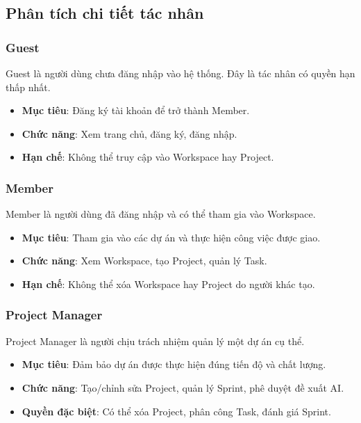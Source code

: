 \documentclass[12pt,a4paper]{report}
\begin{document}
\subsection{Phân tích chi tiết tác nhân}

\subsubsection{Guest}

Guest là người dùng chưa đăng nhập vào hệ thống. Đây là tác nhân có quyền hạn thấp nhất.

\begin{itemize}
\item \textbf{Mục tiêu}: Đăng ký tài khoản để trở thành Member.
\item \textbf{Chức năng}: Xem trang chủ, đăng ký, đăng nhập.
\item \textbf{Hạn chế}: Không thể truy cập vào Workspace hay Project.
\end{itemize}

\subsubsection{Member}

Member là người dùng đã đăng nhập và có thể tham gia vào Workspace.

\begin{itemize}
\item \textbf{Mục tiêu}: Tham gia vào các dự án và thực hiện công việc được giao.
\item \textbf{Chức năng}: Xem Workspace, tạo Project, quản lý Task.
\item \textbf{Hạn chế}: Không thể xóa Workspace hay Project do người khác tạo.
\end{itemize}

\subsubsection{Project Manager}

Project Manager là người chịu trách nhiệm quản lý một dự án cụ thể.

\begin{itemize}
\item \textbf{Mục tiêu}: Đảm bảo dự án được thực hiện đúng tiến độ và chất lượng.
\item \textbf{Chức năng}: Tạo/chỉnh sửa Project, quản lý Sprint, phê duyệt đề xuất AI.
\item \textbf{Quyền đặc biệt}: Có thể xóa Project, phân công Task, đánh giá Sprint.
\end{itemize}
\end{document}
